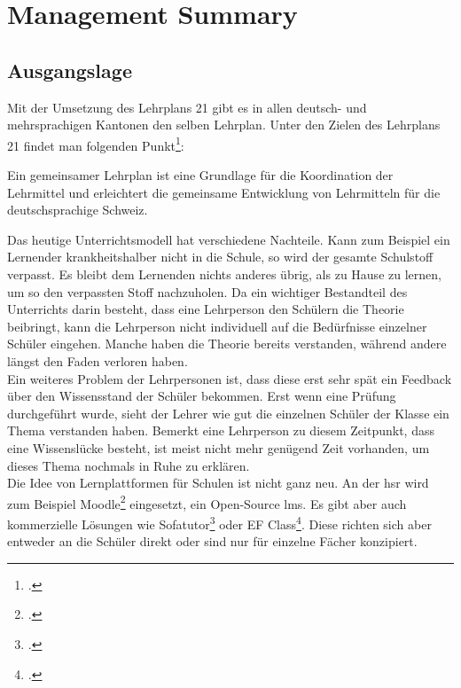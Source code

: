 \section{Management Summary}

\subsection{Ausgangslage}
Mit der Umsetzung des Lehrplans 21 gibt es in allen deutsch- und mehrsprachigen Kantonen den selben Lehrplan. Unter den Zielen des Lehrplans 21 findet man folgenden Punkt\footcite{lp21_ziel}:

\begin{displayquote}
Ein gemeinsamer Lehrplan ist eine Grundlage für die Koordination der Lehrmittel und erleichtert die gemeinsame Entwicklung von Lehrmitteln für die deutschsprachige Schweiz.
\end{displayquote}

Das heutige Unterrichtsmodell hat verschiedene Nachteile. Kann zum Beispiel ein Lernender krankheitshalber nicht in die Schule, so wird der gesamte Schulstoff verpasst. Es bleibt dem Lernenden nichts anderes übrig, als zu Hause zu lernen, um so den verpassten Stoff nachzuholen. Da ein wichtiger Bestandteil des Unterrichts darin besteht, dass eine Lehrperson den Schülern die Theorie beibringt, kann die Lehrperson nicht individuell auf die Bedürfnisse einzelner Schüler eingehen. Manche haben die Theorie bereits verstanden, während andere längst den Faden verloren haben. \\

Ein weiteres Problem der Lehrpersonen ist, dass diese erst sehr spät ein Feedback über den Wissensstand der Schüler bekommen. Erst wenn eine Prüfung durchgeführt wurde, sieht der Lehrer wie gut die einzelnen Schüler der Klasse ein Thema verstanden haben. Bemerkt eine Lehrperson zu diesem Zeitpunkt, dass eine Wissenslücke besteht, ist meist nicht mehr genügend Zeit vorhanden, um dieses Thema nochmals in Ruhe zu erklären. \\


Die Idee von Lernplattformen für Schulen ist nicht ganz neu. An der \gls{hsr} wird zum Beispiel Moodle\footcite{moodle_homepage} eingesetzt, ein Open-Source \gls{lms}. Es gibt aber auch kommerzielle Lösungen wie Sofatutor\footcite{sofatutor_homepage} oder EF Class\footcite{ef_class_homepage}. Diese richten sich aber entweder an die Schüler direkt oder sind nur für einzelne Fächer konzipiert. \\

